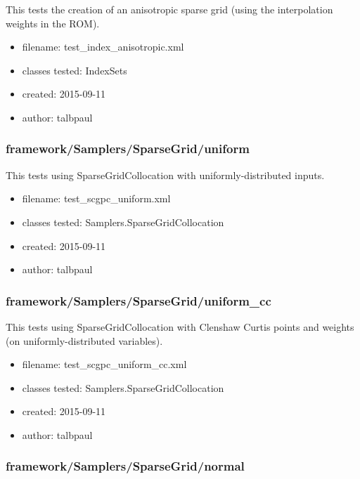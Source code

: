       This tests the creation of an anisotropic sparse grid (using the interpolation weights in the ROM).
    
      \begin{itemize}
          \item filename: test\_index\_anisotropic.xml
          \item classes tested: IndexSets
          \item created: 2015-09-11
          \item author: talbpaul
      \end{itemize}
    \subsubsection{framework/Samplers/SparseGrid/uniform}
      
      This tests using SparseGridCollocation with uniformly-distributed inputs.
    
      \begin{itemize}
          \item filename: test\_scgpc\_uniform.xml
          \item classes tested: Samplers.SparseGridCollocation
          \item created: 2015-09-11
          \item author: talbpaul
      \end{itemize}
    \subsubsection{framework/Samplers/SparseGrid/uniform\_cc}
      
      This tests using SparseGridCollocation with Clenshaw Curtis points and weights (on uniformly-distributed variables).
    
      \begin{itemize}
          \item filename: test\_scgpc\_uniform\_cc.xml
          \item classes tested: Samplers.SparseGridCollocation
          \item created: 2015-09-11
          \item author: talbpaul
      \end{itemize}
    \subsubsection{framework/Samplers/SparseGrid/normal}
      
